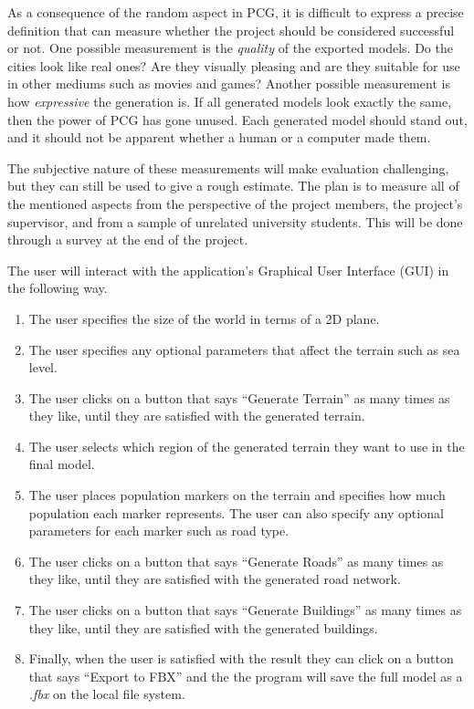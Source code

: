 As a consequence of the random aspect in PCG, it is difficult to express a precise definition that can measure whether the project should be considered successful or not.
One possible measurement is the \textit{quality} of the exported models.
Do the cities look like real ones?
Are they visually pleasing and are they suitable for use in other mediums such as movies and games?
Another possible measurement is how \textit{expressive} the generation is.
If all generated models look exactly the same, then the power of PCG has gone unused.
Each generated model should stand out, and it should not be apparent whether a
human or a computer made them.

The subjective nature of these measurements will make evaluation challenging,
but they can still be used to give a rough estimate.
The plan is to measure all of the mentioned aspects from the perspective of
the project members, the project's supervisor, and from a sample of unrelated
university students. This will be done through a survey at the end of the project.

The user will interact with the application's Graphical User Interface (GUI) in the following way.
\begin{enumerate}
  \item The user specifies the size of the world in terms of a 2D plane.
  \item The user specifies any optional parameters that affect the terrain
    such as sea level.
  \item The user clicks on a button that says ``Generate Terrain'' as many times
    as they like, until they are satisfied with the generated terrain.
  \item The user selects which region of the generated terrain they want to use in the final model.
  \item The user places population markers on the terrain and specifies how much
    population each marker represents. The user can also specify any optional
    parameters for each marker such as road type.
  \item The user clicks on a button that says ``Generate Roads'' as many times
    as they like, until they are satisfied with the generated road network.
  \item The user clicks on a button that says ``Generate Buildings'' as many times
    as they like, until they are satisfied with the generated buildings.
  \item Finally, when the user is satisfied with the result they can click on a
    button that says ``Export to FBX'' and the the program will save the full
    model as a \textit{.fbx} on the local file system.
\end{enumerate}

